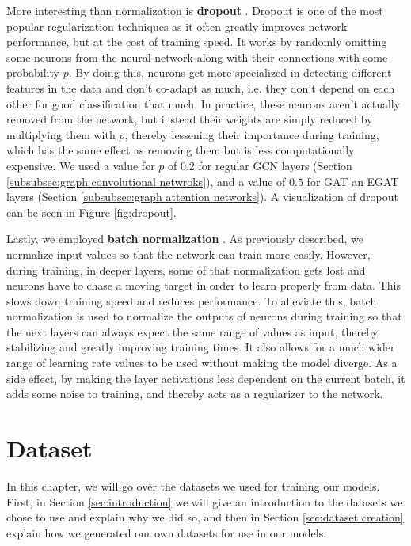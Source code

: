 \documentclass[times, utf8, diplomski, english]{fer_eng}
\begin{document}
More interesting than normalization is \textbf{dropout} \cite{dropout} \cite{dropout2}. Dropout is one of the most popular regularization techniques as it often greatly improves network performance, but at the cost of training speed. It works by randomly omitting some neurons from the neural network along with their connections with some probability $p$. By doing this, neurons get more specialized in detecting different features in the data and don't co-adapt as much, i.e. they don't depend on each other for good classification that much. In practice, these neurons aren't actually removed from the network, but instead their weights are simply reduced by multiplying them with $p$, thereby lessening their importance during training, which has the same effect as removing them but is less computationally expensive. We used a value for $p$ of 0.2 for regular GCN layers (Section \ref{subsubsec:graph convolutional netwroks}), and a value of $0.5$ for GAT an EGAT layers (Section \ref{subsubsec:graph attention networks}). A visualization of dropout can be seen in Figure \ref{fig:dropout}.

Lastly, we employed \textbf{batch normalization} \cite{bn}. As previously described, we normalize input values so that the network can train more easily. However, during training, in deeper layers, some of that normalization gets lost and neurons have to chase a moving target in order to learn properly from data. This slows down training speed and reduces performance. To alleviate this, batch normalization is used to normalize the outputs of neurons during training so that the next layers can always expect the same range of values as input, thereby stabilizing and greatly improving training times. It also allows for a much wider range of learning rate values to be used without making the model diverge. As a side effect, by making the layer activations less dependent on the current batch, it adds some noise to training, and thereby acts as a regularizer to the network.

\chapter{Dataset}
\label{ch:dataset}

In this chapter, we will go over the datasets we used for training our models. First, in Section \ref{sec:introduction} we will give an introduction to the datasets we chose to use and explain why we did so, and then in Section \ref{sec:dataset creation} explain how we generated our own datasets for use in our models.
\end{document}
